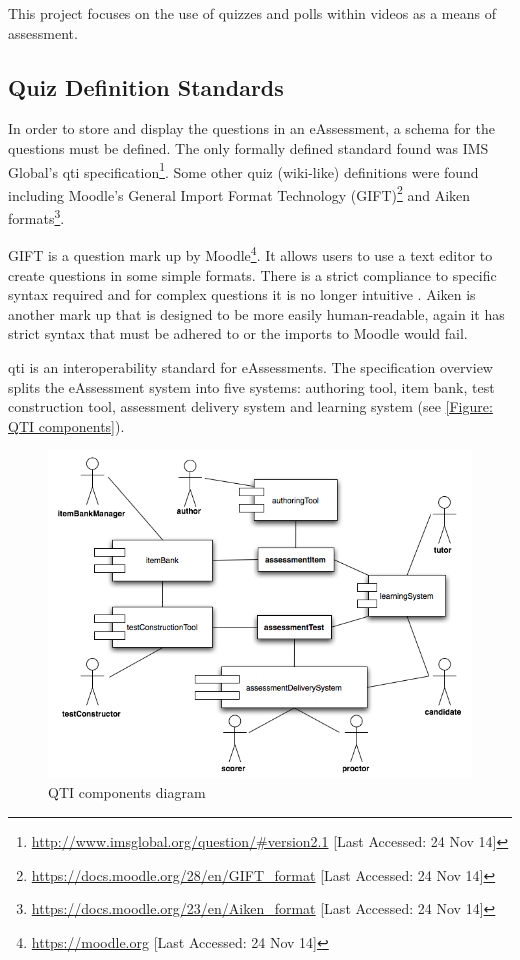 This project focuses on the use of quizzes and polls within videos as a means of assessment.

\subsection{Quiz Definition Standards}
\label{Subsection:Quiz Definition Standards}
In order to store and display the questions in an \gls{eAssessment}, a schema for the questions must be defined. The only formally defined standard found was IMS Global's \gls{qti} specification\footnote{\url{http://www.imsglobal.org/question/\#version2.1} [Last Accessed: 24 Nov 14]}. Some other quiz (wiki-like) definitions were found including Moodle's General Import Format Technology (GIFT)\footnote{\url{https://docs.moodle.org/28/en/GIFT_format} [Last Accessed: 24 Nov 14]} and Aiken formats\footnote{\url{https://docs.moodle.org/23/en/Aiken_format} [Last Accessed: 24 Nov 14]}.

GIFT is a question mark up by Moodle\footnote{\url{https://moodle.org} [Last Accessed: 24 Nov 14]}. It allows users to use a text editor to create questions in some simple formats. There is a strict compliance to specific syntax required and for complex questions it is no longer intuitive \citep{failQTI}. Aiken is another mark up that is designed to be more easily human-readable, again it has strict syntax that must be adhered to or the imports to Moodle would fail.

\gls{qti} is an interoperability standard for \glspl{eAssessment}. The specification overview \citep{qtiOverview} splits the \gls{eAssessment} system into five systems: authoring tool, item bank, test construction tool, assessment delivery system and learning system (see \autoref{Figure: QTI components}).

\begin{figure}[h]
	\centering 
		\includegraphics[scale=0.3]{../figures/componentsQTI.png} 		
	\caption{\label{Figure: QTI components} QTI components diagram \citep{qtiOverview}} 	
\end{figure}

